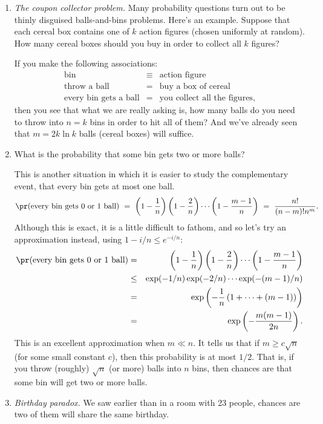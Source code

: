 \begin{enumerate}
\item {\it The coupon collector problem.} Many probability questions turn out to be thinly disguised balls-and-bins problems. Here's an example. Suppose that each cereal box contains one of $k$ action figures (chosen uniformly at random). How many cereal boxes should you buy in order to collect all $k$ figures?

If you make the following associations:
\begin{eqnarray*}
\mbox{bin} & \equiv & \mbox{action figure} \\
\mbox{throw a ball} & = & \mbox{buy a box of cereal} \\
\mbox{every bin gets a ball} & = & \mbox{you collect all the figures},
\end{eqnarray*}
then you see that what we are really asking is, how many balls do you need to throw into $n = k$ bins in order to hit all of them? And we've already seen that $m = 2k\ln k$ balls (cereal boxes) will suffice.

\item What is the probability that some bin gets two or more balls?

This is another situation in which it is easier to study the complementary event, that every bin gets at most one ball.
$$
\pr(\mbox{every bin gets $0$ or $1$ ball})
\ = \ 
\left(1 - \frac{1}{n}\right) \left( 1- \frac{2}{n} \right)\cdots \left( 1- \frac{m-1}{n} \right)
\ = \ 
\frac{n!}{(n-m)! n^m}.
$$
Although this is exact, it is a little difficult to fathom, and so let's try an approximation instead, using $1-i/n \leq e^{-i/n}$:
\begin{eqnarray*}
\pr(\mbox{every bin gets $0$ or $1$ ball})
& = & 
\left(1 - \frac{1}{n}\right) \left( 1 - \frac{2}{n} \right) \cdots \left( 1- \frac{m-1}{n} \right) \\
& \leq & \exp(-1/n) \exp(-2/n) \cdots \exp(-(m-1)/n)  \\
& = & 
\exp\left(-\frac{1}{n} \left(1 + \cdots + (m-1) \right) \right) \\
& = &  
\exp\left(-\frac{m(m-1)}{2n} \right).
\end{eqnarray*}
This is an excellent approximation when $m \ll n$. It tells us that if $m \geq c \sqrt{n}$ (for some small constant $c$), then this probability is at most $1/2$. That is, if you throw (roughly) $\sqrt{n}$ (or more) balls into $n$ bins, then chances are that some bin will get two or more balls.

\item {\it Birthday paradox.} We saw earlier than in a room with 23 people, chances are two of them will share the same birthday.


\end{enumerate}
